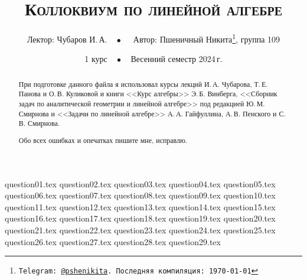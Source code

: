 \documentclass[a4paper, 11pt]{article}
\begin{document}
\title{\bfseries\scshape Коллоквиум по линейной алгебре}
\date{1 курс$\quad\bullet\quad$Весенний семестр 2024\,г.}
\author{Лектор: Чубаров И.\,А.$\quad\bullet\quad$ Автор: Пшеничный Никита\thanks{\texttt{Telegram: \href{https://t.me/pshenikita}{@pshenikita}. Последняя компиляция: \today}}, группа 109}

\maketitle

\begin{abstract}
    При подготовке данного файла я использовал курсы лекций И.\,А. Чубарова, Т.\,Е. Панова и О.\,В. Куликовой и книги <<Курс алгебры>> Э.\,Б. Винберга, <<Сборник задач по аналитической геометрии и линейной алгебре>> под редакцией Ю.\,М. Смирнова и <<Задачи по линейной алгебре>> А.\,А. Гайфуллина, А.\,В. Пенского и С.\,В. Смирнова.

    Обо всех ошибках и опечатках пишите мне, исправлю.
\end{abstract}

\tableofcontents

\newpage

{question01.tex}
{question02.tex}
{question03.tex}
{question04.tex}
{question05.tex}
{question06.tex}
{question07.tex}
{question08.tex}
{question09.tex}
{question10.tex}
{question11.tex}
{question12.tex}
{question13.tex}
{question14.tex}
{question15.tex}
{question16.tex}
{question17.tex}
{question18.tex}
{question19.tex}
{question20.tex}
{question21.tex}
{question22.tex}
{question23.tex}
{question24.tex}
{question25.tex}
{question26.tex}
{question27.tex}
{question28.tex}
{question29.tex}
\end{document}
